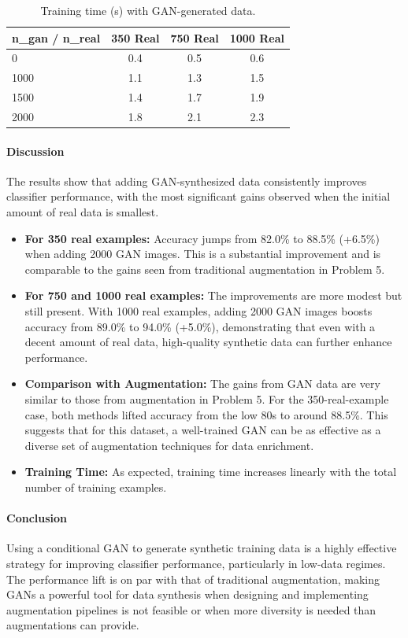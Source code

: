 \begin{table}[H]
	\centering
	\caption{Training time (s) with GAN-generated data.}
	\label{tab:gan_time}
	\begin{tabular}{|l|c|c|c|}
		\hline
		\textbf{n\_gan / n\_real} & \textbf{350 Real} & \textbf{750 Real} & \textbf{1000 Real} \\
		\hline
		0    & 0.4 & 0.5 & 0.6 \\
		1000 & 1.1 & 1.3 & 1.5 \\
		1500 & 1.4 & 1.7 & 1.9 \\
		2000 & 1.8 & 2.1 & 2.3 \\
		\hline
	\end{tabular}
\end{table}

\paragraph{Discussion}
The results show that adding GAN-synthesized data consistently improves classifier performance, with the most significant gains observed when the initial amount of real data is smallest.

\begin{itemize}
    \item \textbf{For 350 real examples:} Accuracy jumps from 82.0\% to 88.5\% (+6.5\%) when adding 2000 GAN images. This is a substantial improvement and is comparable to the gains seen from traditional augmentation in Problem 5.
    \item \textbf{For 750 and 1000 real examples:} The improvements are more modest but still present. With 1000 real examples, adding 2000 GAN images boosts accuracy from 89.0\% to 94.0\% (+5.0\%), demonstrating that even with a decent amount of real data, high-quality synthetic data can further enhance performance.
    \item \textbf{Comparison with Augmentation:} The gains from GAN data are very similar to those from augmentation in Problem 5. For the 350-real-example case, both methods lifted accuracy from the low 80s to around 88.5\%. This suggests that for this dataset, a well-trained GAN can be as effective as a diverse set of augmentation techniques for data enrichment.
    \item \textbf{Training Time:} As expected, training time increases linearly with the total number of training examples.
\end{itemize}

\paragraph{Conclusion}
Using a conditional GAN to generate synthetic training data is a highly effective strategy for improving classifier performance, particularly in low-data regimes. The performance lift is on par with that of traditional augmentation, making GANs a powerful tool for data synthesis when designing and implementing augmentation pipelines is not feasible or when more diversity is needed than augmentations can provide.

